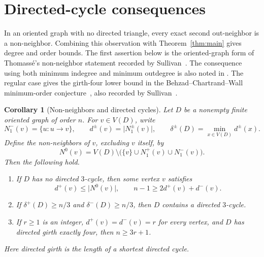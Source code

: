 \documentclass[11pt]{article}
\newtheorem{corollary}[theorem]{Corollary}
\theoremstyle{remark}
\newcommand{\abs}[1]{\lvert #1\rvert}
\begin{document}
\section{Directed-cycle consequences}\label{sec:directed-cycle-consequences}

In an oriented graph with no directed triangle, every exact second
out-neighbor is a non-neighbor. Combining this observation with
Theorem~\ref{thm:main} gives degree and order bounds.
The first assertion below is the oriented-graph form of Thomass\'e's
non-neighbor statement recorded by
Sullivan~\cite[Conjecture~6.12]{Sullivan2006}.
The consequence using both minimum indegree and minimum outdegree is also
noted in \cite[Section~3]{Sullivan2006}. The regular case gives the
girth-four lower bound in the Behzad--Chartrand--Wall minimum-order
conjecture~\cite{BehzadChartrandWall1970}, also recorded by
Sullivan~\cite[Section~4]{Sullivan2006}.

\begin{corollary}[Non-neighbors and directed cycles]\label{cor:directed-cycle-consequences}
Let \(D\) be a nonempty finite oriented graph of order \(n\). For
\(v\in V(D)\), write
\[
 N_1^-(v)=\{u:u\to v\},\qquad
 d^\pm(v)=\abs{N_1^\pm(v)},\qquad
 \delta^\pm(D)=\min_{x\in V(D)}d^\pm(x).
\]
Define the non-neighbors of \(v\), excluding \(v\) itself, by
\[
 N^0(v)=V(D)\setminus
 \bigl(\{v\}\cup N_1^+(v)\cup N_1^-(v)\bigr).
\]
Then the following hold.
\begin{enumerate}[label=\textup{(\roman*)}]
\item If \(D\) has no directed \(3\)-cycle, then some vertex \(v\) satisfies
\[
 d^+(v)\leq\abs{N^0(v)},\qquad
 n-1\geq 2d^+(v)+d^-(v).
\]
\item If \(\delta^+(D)\geq n/3\) and \(\delta^-(D)\geq n/3\), then \(D\)
contains a directed \(3\)-cycle.
\item If \(r\geq1\) is an integer, \(d^+(v)=d^-(v)=r\) for every vertex,
and \(D\) has directed girth exactly four, then \(n\geq3r+1\).
\end{enumerate}
Here directed girth is the length of a shortest directed cycle.
\end{corollary}
\end{document}
